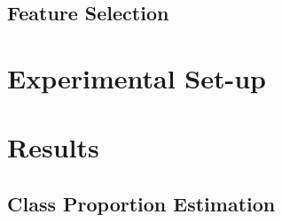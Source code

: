 \subsection{Feature Selection}

\section{Experimental Set-up}
\label{sec:what2}


\section{Results}
\label{sec:what}

\subsection{Class Proportion Estimation}

